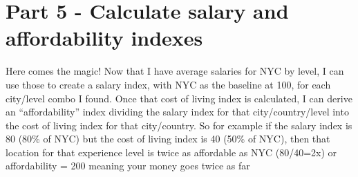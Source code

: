 \documentclass[11pt]{article}
\begin{document}
    \hypertarget{part-5---calculate-salary-and-affordability-indexes}{%
\section{Part 5 - Calculate salary and affordability
indexes}\label{part-5---calculate-salary-and-affordability-indexes}}

    Here comes the magic! Now that I have average salaries for NYC by level,
I can use those to create a salary index, with NYC as the baseline at
100, for each city/level combo I found. Once that cost of living index
is calculated, I can derive an ``affordability'' index dividing the
salary index for that city/country/level into the cost of living index
for that city/country. So for example if the salary index is 80 (80\% of
NYC) but the cost of living index is 40 (50\% of NYC), then that
location for that experience level is twice as affordable as NYC
(80/40=2x) or affordability = 200 meaning your money goes twice as far
\end{document}
